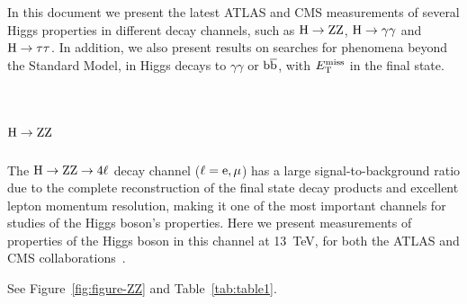 \documentclass[10pt]{article}
\begin{document}
In this document we present the latest ATLAS and CMS measurements of several
Higgs properties in different decay channels, such as ${\rm H\to ZZ}$,
${\rm H\to\gamma\gamma}$ and ${\rm H\to\tau\tau}$. In addition, we also present
results on searches for phenomena beyond the Standard Model, in Higgs decays
to $\gamma\gamma$ or ${\rm b\bar{b}}$, with $E_{\rm T}^{\rm miss}$ in the final
state.


\section{\boldmath ${\rm H}\to{\rm ZZ}$}

The ${\rm H\to ZZ\to 4\ell}$ decay channel (${\rm \ell = e,\mu}$) has a large
signal-to-background ratio due to the complete reconstruction of the final state
decay products and excellent lepton momentum resolution, making it one of the
most important channels for studies of the Higgs boson's properties. Here we
present measurements of properties of the Higgs boson in this channel at 13~TeV,
for both the ATLAS and CMS collaborations~\cite{ATLAS-ZZ,CMS:2017jkd}.

See Figure~\ref{fig:figure-ZZ} and Table~\ref{tab:table1}. 
\end{document}
